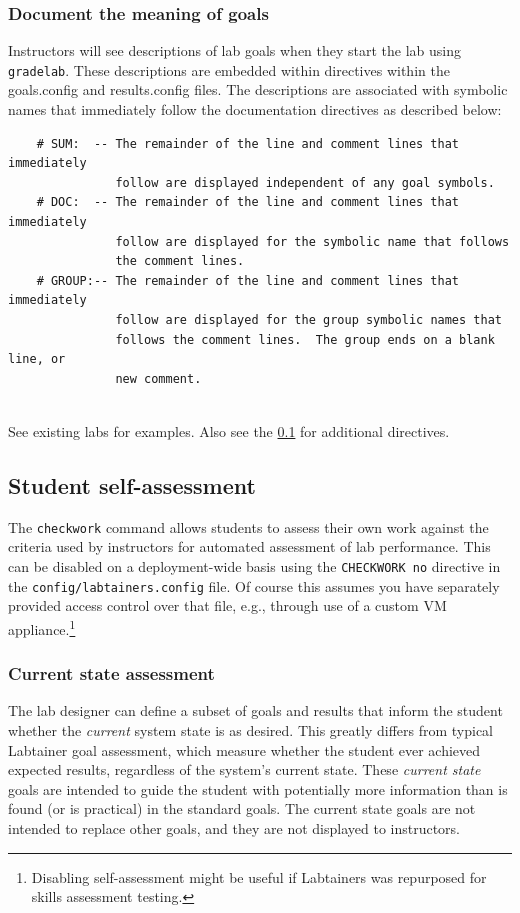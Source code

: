 \documentclass[12pt]{article}
\begin{document}
\subsubsection{Document the meaning of goals}
\label{document goals}
Instructors will see descriptions of lab goals when they start the lab using {\tt gradelab}.
These descriptions are embedded within directives within the goals.config and results.config files.
The descriptions are associated with symbolic names that immediately follow the documentation
directives as described below:
\begin{verbatim}
    # SUM:  -- The remainder of the line and comment lines that immediately
               follow are displayed independent of any goal symbols.
    # DOC:  -- The remainder of the line and comment lines that immediately 
               follow are displayed for the symbolic name that follows
               the comment lines.
    # GROUP:-- The remainder of the line and comment lines that immediately 
               follow are displayed for the group symbolic names that 
               follows the comment lines.  The group ends on a blank line, or 
               new comment.
   
\end{verbatim} 
\noindent See existing labs for examples.  Also see the \ref{checkwork} for additional directives.

\subsection {Student self-assessment}
\label{checkwork}
The {\tt checkwork} command allows students to assess their own work against
the criteria used by instructors for automated assessment of lab performance.
This can be disabled on a deployment-wide basis using the {\tt CHECKWORK no} directive
in the {\tt config/labtainers.config} file.  Of course this assumes you have separately
provided access control over that file, e.g., through use of a custom VM appliance.\footnote{
Disabling self-assessment might be useful if Labtainers was repurposed for skills assessment
testing.}

\subsubsection {Current state assessment}
\label{current-state}
The lab designer can define a subset of goals and results that inform the student
whether the \textit{current} system state is as desired.  This greatly differs
from typical Labtainer goal assessment, which measure whether the student ever
achieved expected results, regardless of the system's current state.  These 
\textit{current state} goals are intended to guide the student with potentially
more information than is found (or is practical) in the standard goals.  The current state goals
are not intended to replace other goals, and they are not displayed to instructors.
\end{document}

